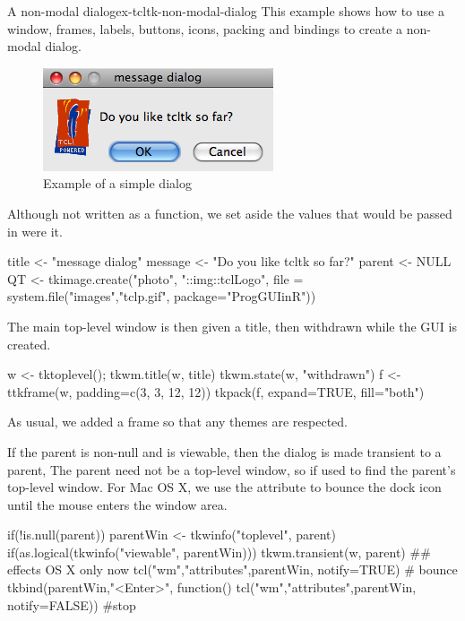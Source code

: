 \begin{example}{A non-modal dialog}{ex-tcltk-non-modal-dialog}
This example shows how to use  a window, frames,  labels, buttons,
icons, packing and bindings to create a non-modal dialog. 

\begin{figure}
  \centering
  \includegraphics[width=.6\textwidth]{fig-tcltk-simple-dialog.png}
  \caption{Example of a simple dialog}
  \label{fig:fig-tcltk-simple-dialog}
\end{figure}

Although not written as a function, we set aside the values that would
be passed in were it.
\begin{Schunk}
\begin{Sinput}
 title <- "message dialog"
 message <- "Do you like tcltk so far?"
 parent <- NULL
 QT <- tkimage.create("photo", "::img::tclLogo", 
                      file = system.file("images","tclp.gif",
                        package="ProgGUIinR"))
\end{Sinput}
\end{Schunk}

The main top-level window is then given a title, then withdrawn while
the GUI is created. 
\begin{Schunk}
\begin{Sinput}
 w <- tktoplevel(); tkwm.title(w, title)
 tkwm.state(w, "withdrawn")
 f <- ttkframe(w,  padding=c(3, 3, 12, 12))
 tkpack(f, expand=TRUE, fill="both")
\end{Sinput}
\end{Schunk}
As usual, we added a frame so that any themes are respected.

If the parent is non-null and is viewable, then the dialog is made
transient to a parent, The parent need not be a top-level window, so
 if used to find the parent's top-level window. For
Mac OS X, we use the  attribute to bounce the dock icon
until the mouse enters the window area.

\begin{Schunk}
\begin{Sinput}
 if(!is.null(parent)) {
   parentWin <- tkwinfo("toplevel", parent)
   if(as.logical(tkwinfo("viewable", parentWin))) {
     tkwm.transient(w, parent)
     ## effects OS X only now
     tcl("wm","attributes",parentWin, notify=TRUE) # bounce
     tkbind(parentWin,"<Enter>", function() 
       tcl("wm","attributes",parentWin, notify=FALSE)) #stop
   }
 }
\end{Sinput}
\end{Schunk}


\end{example}
